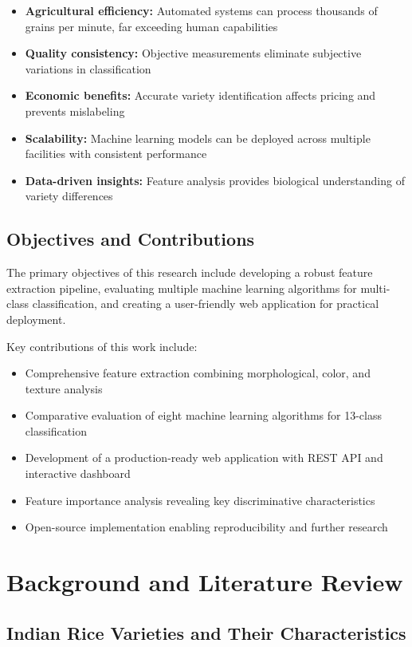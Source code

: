 \documentclass[conference]{IEEEtran}
\begin{document}
\begin{itemize}
    \item \textbf{Agricultural efficiency:} Automated systems can process thousands of grains per minute, far exceeding human capabilities
    \item \textbf{Quality consistency:} Objective measurements eliminate subjective variations in classification
    \item \textbf{Economic benefits:} Accurate variety identification affects pricing and prevents mislabeling
    \item \textbf{Scalability:} Machine learning models can be deployed across multiple facilities with consistent performance
    \item \textbf{Data-driven insights:} Feature analysis provides biological understanding of variety differences
\end{itemize}

\subsection{Objectives and Contributions}

The primary objectives of this research include developing a robust feature extraction pipeline, evaluating multiple machine learning algorithms for multi-class classification, and creating a user-friendly web application for practical deployment.

Key contributions of this work include:
\begin{itemize}
    \item Comprehensive feature extraction combining morphological, color, and texture analysis
    \item Comparative evaluation of eight machine learning algorithms for 13-class classification
    \item Development of a production-ready web application with REST API and interactive dashboard
    \item Feature importance analysis revealing key discriminative characteristics
    \item Open-source implementation enabling reproducibility and further research
\end{itemize}

\section{Background and Literature Review}

\subsection{Indian Rice Varieties and Their Characteristics}
\end{document}
